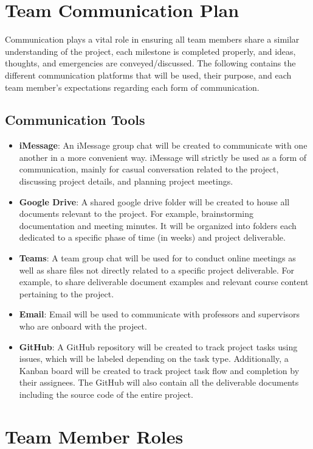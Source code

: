 \documentclass{article}
\begin{document}
\section{Team Communication Plan}

Communication plays a vital role in ensuring all team members share a similar understanding of the project, each milestone is completed properly, and ideas, thoughts, and emergencies are conveyed/discussed. 
The following contains the different communication platforms that will be used, their purpose, and each team member’s expectations regarding each form of communication.

\subsection{Communication Tools}
\begin{itemize}
    \item \textbf{iMessage}: An iMessage group chat will be created to communicate with one another in a more convenient way. iMessage will strictly be used as a form of communication, mainly for casual conversation related to the project, discussing project details, and planning project meetings.
    \item \textbf{Google Drive}: A shared google drive folder will be created to house all documents relevant to the project. For example, brainstorming documentation and meeting minutes. It will be organized into folders each dedicated to a specific phase of time (in weeks) and project deliverable. 
    \item \textbf{Teams}: A team group chat will be used for to conduct online meetings as well as share files not directly related to a specific project deliverable. For example, to share deliverable document examples and relevant course content pertaining to the project.
    \item \textbf{Email}: Email will be used to communicate with professors and supervisors who are onboard with the project.
    \item \textbf{GitHub}: A GitHub repository will be created to track project tasks using issues, which will be labeled depending on the task type. Additionally, a Kanban board will be created to track project task flow and completion by their assignees. The GitHub will also contain all the deliverable documents including the source code of the entire project.
\end{itemize}

\section{Team Member Roles}
\end{document}
